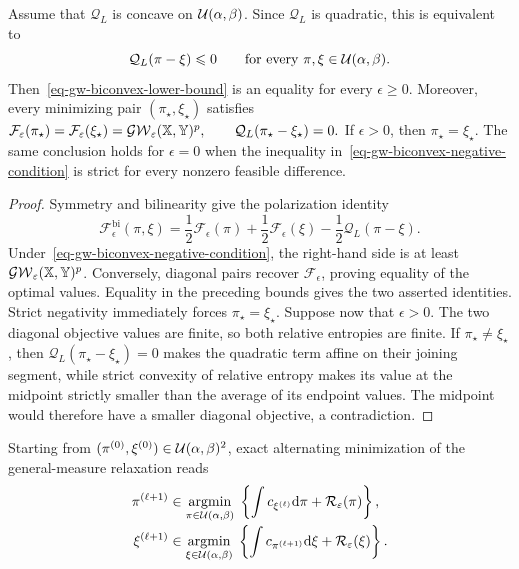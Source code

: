 \begin{prop}\label{prop-gw-biconvex-tightness}
Assume that $\mathcal Q_L$ is concave on $\mathcal{U}(\alpha,\beta)$. Since $\mathcal Q_L$ is quadratic, this is equivalent to
\begin{equation}\label{eq-gw-biconvex-negative-condition}
\mathcal Q_L(\pi-\xi)\leqslant0
\qquad
\text{for every }\pi,\xi\in\mathcal{U}(\alpha,\beta).
\end{equation}
Then~\eqref{eq-gw-biconvex-lower-bound} is an equality for every $\epsilon\geq0$. Moreover, every minimizing pair $(\pi_\star,\xi_\star)$ satisfies
\(\mathcal F_\varepsilon(\pi_\star) = \mathcal F_\varepsilon(\xi_\star) = \operatorname{\mathcal{GW}}_\varepsilon(\mathbb{X},\mathbb{Y})^p, \qquad \mathcal Q_L(\pi_\star-\xi_\star)=0.\)
If $\epsilon>0$, then $\pi_\star=\xi_\star$. The same conclusion holds for $\epsilon=0$ when the inequality in~\eqref{eq-gw-biconvex-negative-condition} is strict for every nonzero feasible difference.
\end{prop}
\begin{proof}
Symmetry and bilinearity give the polarization identity
\begin{equation}\label{eq-gw-biconvex-polarization}
\mathcal F_\epsilon^{\mathrm{bi}}(\pi,\xi)
=
\frac12\mathcal F_\epsilon(\pi)
+
\frac12\mathcal F_\epsilon(\xi)
-
\frac12\mathcal Q_L(\pi-\xi).
\end{equation}
Under~\eqref{eq-gw-biconvex-negative-condition}, the right-hand side is at least $\operatorname{\mathcal{GW}}_\varepsilon(\mathbb{X},\mathbb{Y})^p$. Conversely, diagonal pairs recover $\mathcal F_\epsilon$, proving equality of the optimal values. Equality in the preceding bounds gives the two asserted identities. Strict negativity immediately forces $\pi_\star=\xi_\star$. Suppose now that $\epsilon>0$. The two diagonal objective values are finite, so both relative entropies are finite. If $\pi_\star\ne\xi_\star$, then $\mathcal Q_L(\pi_\star-\xi_\star)=0$ makes the quadratic term affine on their joining segment, while strict convexity of relative entropy makes its value at the midpoint strictly smaller than the average of its endpoint values. The midpoint would therefore have a smaller diagonal objective, a contradiction.
\end{proof}
Starting from $(\pi^{(0)},\xi^{(0)})\in\mathcal{U}(\alpha,\beta)^2$, exact alternating minimization of the general-measure relaxation reads
\begin{align}\label{eq-gw-biconvex-alternating-general}
\pi^{(\ell+1)}
&\in
\underset{\pi\in\mathcal{U}(\alpha,\beta)}{\operatorname{argmin}}\;
\left\{\int c_{\xi^{(\ell)}}\mathrm{d}\pi+\mathcal R_\varepsilon(\pi)\right\},
\\[-.2em]
\xi^{(\ell+1)}
&\in
\underset{\xi\in\mathcal{U}(\alpha,\beta)}{\operatorname{argmin}}\;
\left\{\int c_{\pi^{(\ell+1)}}\mathrm{d}\xi+\mathcal R_\varepsilon(\xi)\right\}.
\end{align}
